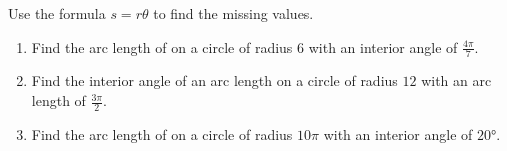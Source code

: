 \begin{myPractice}
	Use the formula $s=r\theta$ to find the missing values.
			\begin{enumerate}
				\item Find the arc length of on a circle of radius $6$ with an interior angle of $\frac{4\pi}{7}$.
				\vfill
				\item Find the interior angle of an arc length on a circle of radius $12$ with an arc length of $\frac{3\pi}{2}$.
				\vfill
				\item Find the arc length of on a circle of radius $10\pi$ with an interior angle of $\ang{20}$.
				\vfill
			\end{enumerate}
		\vfill
\end{myPractice}

\newpage

